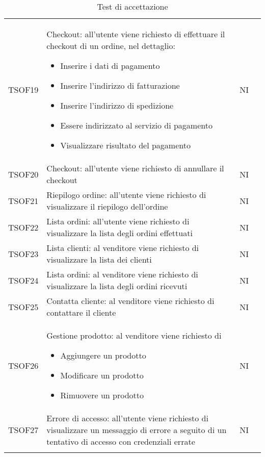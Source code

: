 \begin{center}
\begin{longtable}[!h]{p{50px} p{245px} p{75px} p{50px}}
        TSOF19  & Checkout: all'utente viene richiesto di effettuare il checkout di un ordine, nel dettaglio: \begin{itemize} \item Inserire i dati di pagamento \item Inserire l'indirizzo di fatturazione \item Inserire l'indirizzo di spedizione \item Essere indirizzato al servizio di pagamento \item Visualizzare risultato del pagamento \end{itemize} & NI \\
        TSOF20  & Checkout: all'utente viene richiesto di annullare il checkout & NI \\
        TSOF21  & Riepilogo ordine: all'utente viene richiesto di visualizzare il riepilogo dell'ordine & NI \\
        TSOF22  & Lista ordini: all'utente viene richiesto di visualizzare la lista degli ordini effettuati  & NI \\
        TSOF23  & Lista clienti: al venditore viene richiesto di visualizzare la lista dei clienti & NI \\
        TSOF24  & Lista ordini: al venditore viene richiesto di visualizzare la lista degli ordini ricevuti & NI \\
        TSOF25  & Contatta cliente: al venditore viene richiesto di contattare il cliente & NI \\
        TSOF26  & Gestione prodotto: al venditore viene richiesto di \begin{itemize} \item Aggiungere un prodotto \item Modificare un prodotto \item Rimuovere un prodotto \end{itemize} & NI \\
        TSOF27  & Errore di accesso: all'utente viene richiesto di visualizzare un messaggio di errore a seguito di un tentativo di accesso con credenziali errate & NI \\
        \rowcolor{white}\caption{Test di accettazione}            
    \end{longtable}    
\end{center}